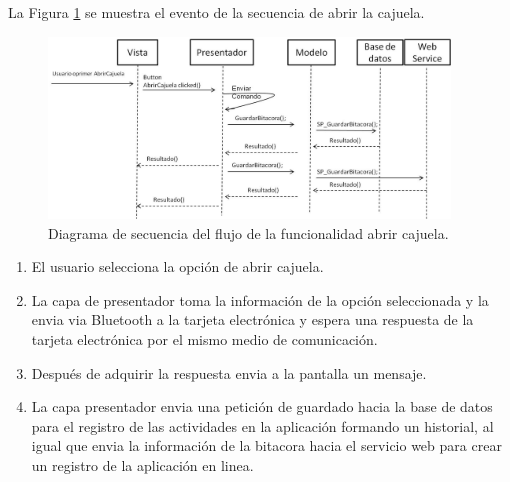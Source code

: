 La Figura \ref{ds10} se muestra el evento de la secuencia de abrir la cajuela.\\
\begin{figure}[H]
\centering
\includegraphics[width=0.95\textwidth]{metodologia/DSAbrirCajuela.jpg}
\caption{Diagrama de secuencia del flujo de la funcionalidad abrir cajuela.}
\label{ds10}
\end{figure}
%
 \begin{enumerate}
\item El usuario selecciona la opción de abrir cajuela.
\item La capa de presentador toma la información de la opción seleccionada y la envia via Bluetooth a la tarjeta electrónica y espera una respuesta de la tarjeta electrónica por el mismo medio de comunicación.
\item Después de adquirir la respuesta envia a la pantalla un mensaje.
\item La capa presentador envia una petición de guardado hacia la base de datos para el registro de las actividades en la aplicación formando un historial, al igual que envia la información de la bitacora hacia el servicio web para crear un registro de la aplicación en linea.
\end{enumerate}

